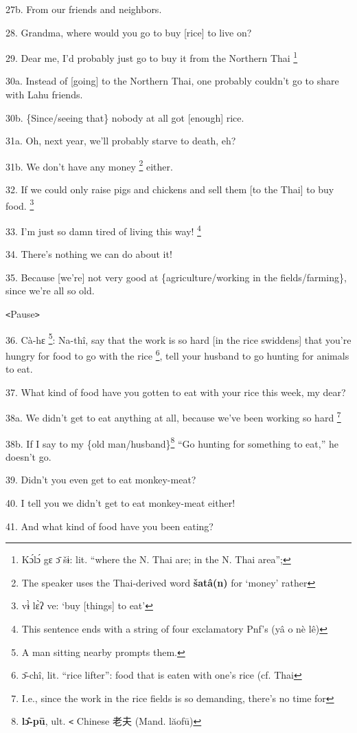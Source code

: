 27b. From our friends and neighbors.

28. Grandma, where would you go to buy [rice] to live on?

29. Dear me, I'd probably just go to buy it from the Northern Thai \.\footnote{Kɔ́lɔ́ gɛ ɔ̄ šɨ: lit. ``where the N. Thai are; in the N. Thai area'';}

30a. Instead of [going] to the Northern Thai, one probably couldn't go to share
with Lahu friends.

30b. \{Since/seeing that\} nobody at all got [enough] rice.

31a. Oh, next year, we'll probably starve to death, eh?

31b. We don't have any money \footnote{The speaker uses the Thai-derived word \textbf{šatâ(n)} for `money' rather} either.

32. If we could only raise pigs and chickens and sell them [to the Thai] to buy
food. \footnote{vɨ̀ lɛ̀ʔ ve: `buy [things] to eat'}

33. I'm just so damn tired of living this way! \footnote{This sentence ends with a string of four exclamatory Pnf's (yâ o nè lê)}

34. There's nothing we can do about it!

35. Because [we're] not very good at \{agriculture/working in the fields/farming\},
since we're all so old.

\texttt{<}Pause\texttt{>}

36. Cà-hɛ \footnote{A man sitting nearby prompts them.}: Na-thî, say that the work is so hard [in the rice swiddens]
that you're hungry for food to go with the rice \footnote{ɔ̄-chî, lit. ``rice lifter'': food that is eaten with one's rice (cf. Thai}, tell your husband to go hunting
for animals to eat.

37. What kind of food have you gotten to eat with your rice this week, my dear?

38a. We didn't get to eat anything at all, because we've been working so hard \.\footnote{I.e., since the work in the rice fields is so demanding, there's no time for}

38b. If I say to my \{old man/husband\}\footnote{\textbf{lɔ̂-pū}, ult. \texttt{<} Chinese 老夫 (Mand. lăofū)} ``Go hunting for something to eat,''
he doesn't go.

39. Didn't you even get to eat monkey-meat?

40. I tell you we didn't get to eat monkey-meat either!

41. And what kind of food have you been eating?

